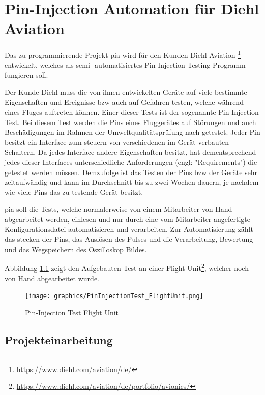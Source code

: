 \chapter{Pin-Injection Automation für Diehl Aviation}
\label{ch:pia}

Das zu programmierende Projekt \ac{pia} wird für den Kunden Diehl Aviation
\footnote{\url{https://www.diehl.com/aviation/de/}} entwickelt, welches als semi-
automatisiertes Pin Injection Testing Programm fungieren soll.

Der Kunde Diehl muss die von ihnen entwickelten Geräte auf viele bestimmte Eigenschaften und
Ereignisse \ac{bzw} auch auf Gefahren testen, welche während eines Fluges auftreten können.
Einer dieser Tests ist der sogenannte Pin-Injection Test.
Bei diesem Test werden die Pins eines Fluggerätes auf Störungen und auch Beschädigungen im
Rahmen der Umweltqualitätsprüfung nach  getestet. Jeder Pin besitzt ein Interface
zum steuern von verschiedenen im Gerät verbauten Schaltern. Da jedes Interface andere
Eigenschaften besitzt, hat dementsprechend jedes dieser Interfaces unterschiedliche
Anforderungen (engl: "Requirements") die getestet werden müssen.
Demzufolge ist das Testen der Pins \ac{bzw} der Geräte sehr zeitaufwändig und kann im
Durchschnitt bis zu zwei Wochen dauern, je nachdem wie viele Pins das zu testende Gerät
besitzt.

\ac{pia} soll die Tests, welche normalerweise von einem Mitarbeiter von Hand abgearbeitet
werden, einlesen und nur durch eine vom Mitarbeiter angefertigte Konfigurationsdatei
automatisieren und verarbeiten. Zur Automatisierung zählt das stecken der Pins, das Auslösen des Pulses und die Verarbeitung, Bewertung und das Wegspeichern des Oszilloskop Bildes.

\pagebreak
Abbildung \ref{fig:flight_unit} zeigt den Aufgebauten Test an einer Flight Unit\footnote{\url{https://www.diehl.com/aviation/de/portfolio/avionics/}}, welcher noch von Hand abgearbeitet wurde.

\begin{figure}[H]
	\centering
	\texttt{[image: graphics/PinInjectionTest\_FlightUnit.png]}
	\caption{Pin-Injection Test Flight Unit}
	\label{fig:flight_unit}
\end{figure}


\section{Projekteinarbeitung}
\label{sec:prj-einarbeitung}

